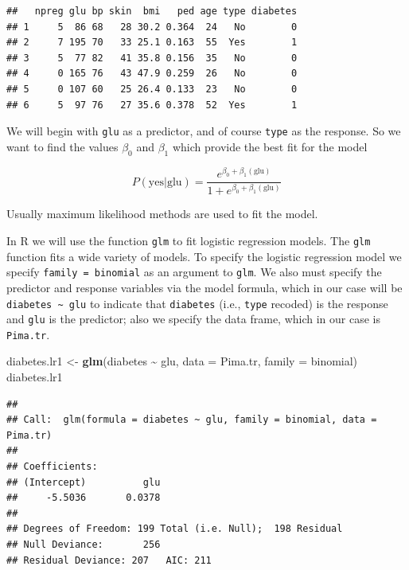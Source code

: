 \documentclass[
]{krantz}
\newenvironment{Shaded}{\begin{snugshade}}{\end{snugshade}}
\newcommand{\DataTypeTok}[1]{\textcolor[rgb]{0.13,0.29,0.53}{#1}}
\newcommand{\KeywordTok}[1]{\textcolor[rgb]{0.13,0.29,0.53}{\textbf{#1}}}
\newcommand{\NormalTok}[1]{#1}
\newcommand{\OperatorTok}[1]{\textcolor[rgb]{0.81,0.36,0.00}{\textbf{#1}}}
\newcommand{\StringTok}[1]{\textcolor[rgb]{0.31,0.60,0.02}{#1}}
\begin{document}
\begin{verbatim}
##   npreg glu bp skin  bmi   ped age type diabetes
## 1     5  86 68   28 30.2 0.364  24   No        0
## 2     7 195 70   33 25.1 0.163  55  Yes        1
## 3     5  77 82   41 35.8 0.156  35   No        0
## 4     0 165 76   43 47.9 0.259  26   No        0
## 5     0 107 60   25 26.4 0.133  23   No        0
## 6     5  97 76   27 35.6 0.378  52  Yes        1
\end{verbatim}

We will begin with \texttt{glu} as a predictor, and of course \texttt{type} as the response. So we want to find the values \(\beta_0\) and \(\beta_1\) which provide the best fit for the model

\[
P(\text{yes} | \text{glu}) = \frac{e^{\beta_0 + \beta_1 (\text{glu})}}{1 + e^{\beta_0 + \beta_1 (\text{glu})}}
\]

Usually maximum likelihood methods are used to fit the model.

In R we will use the function \texttt{glm} to fit logistic regression models. The \texttt{glm} function fits a wide variety of models. To specify the logistic regression model we specify \texttt{family\ =\ binomial} as an argument to \texttt{glm}. We also must specify the predictor and response variables via the model formula, which in our case will be \texttt{diabetes\ \textasciitilde{}\ glu} to indicate that \texttt{diabetes} (i.e., \texttt{type} recoded) is the response and \texttt{glu} is the predictor; also we specify the data frame, which in our case is \texttt{Pima.tr}.

\begin{Shaded}
\begin{Highlighting}[]
\NormalTok{diabetes.lr1 \textless{}{-}}\StringTok{ }\KeywordTok{glm}\NormalTok{(diabetes }\OperatorTok{\textasciitilde{}}\StringTok{ }\NormalTok{glu, }\DataTypeTok{data =}\NormalTok{ Pima.tr, }
            \DataTypeTok{family =}\NormalTok{ binomial)}
\NormalTok{diabetes.lr1}
\end{Highlighting}
\end{Shaded}

\begin{verbatim}
## 
## Call:  glm(formula = diabetes ~ glu, family = binomial, data = Pima.tr)
## 
## Coefficients:
## (Intercept)          glu  
##     -5.5036       0.0378  
## 
## Degrees of Freedom: 199 Total (i.e. Null);  198 Residual
## Null Deviance:       256 
## Residual Deviance: 207   AIC: 211
\end{verbatim}
\end{document}
